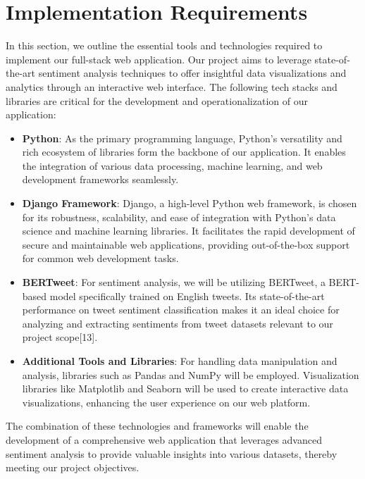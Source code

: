\documentclass[conference]{IEEEtran}
\begin{document}
\section{Implementation Requirements}
In this section, we outline the essential tools and technologies required to implement our full-stack web application. Our project aims to leverage state-of-the-art sentiment analysis techniques to offer insightful data visualizations and analytics through an interactive web interface. The following tech stacks and libraries are critical for the development and operationalization of our application:

\begin{itemize}
    \item \textbf{Python}: As the primary programming language, Python's versatility and rich ecosystem of libraries form the backbone of our application. It enables the integration of various data processing, machine learning, and web development frameworks seamlessly.
    
    \item \textbf{Django Framework}: Django, a high-level Python web framework, is chosen for its robustness, scalability, and ease of integration with Python's data science and machine learning libraries. It facilitates the rapid development of secure and maintainable web applications, providing out-of-the-box support for common web development tasks.
    
    \item \textbf{BERTweet}: For sentiment analysis, we will be utilizing BERTweet, a BERT-based model specifically trained on English tweets. Its state-of-the-art performance on tweet sentiment classification makes it an ideal choice for analyzing and extracting sentiments from tweet datasets relevant to our project scope[13].
    
    \item \textbf{Additional Tools and Libraries}: For handling data manipulation and analysis, libraries such as Pandas and NumPy will be employed. Visualization libraries like Matplotlib and Seaborn will be used to create interactive data visualizations, enhancing the user experience on our web platform.
\end{itemize}

The combination of these technologies and frameworks will enable the development of a comprehensive web application that leverages advanced sentiment analysis to provide valuable insights into various datasets, thereby meeting our project objectives.
\end{document}
